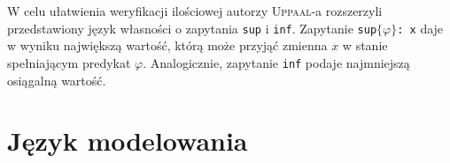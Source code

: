 \documentclass{pracamgr}
\newcommand{\upp}{\textsc{Uppaal}}
\theoremstyle{plain}
\begin{document}
W celu ułatwienia weryfikacji ilościowej autorzy \upp-a rozszerzyli
przedstawiony język własności o zapytania \texttt{sup} i \texttt{inf}.
Zapytanie \texttt{sup$\{\varphi\}$: x} daje w wyniku największą wartość,
którą może przyjąć zmienna $x$ w stanie spełniającym predykat $\varphi$.
Analogicznie, zapytanie \texttt{inf} podaje najmniejszą osiągalną wartość.

\chapter{Język modelowania}


{}





\end{document}
